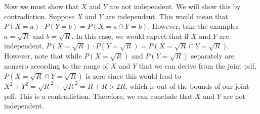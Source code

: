 \documentclass{article}
\begin{document}
{Now we must show that $X$ and $Y$ are not independent. We will show this by contradiction. Suppose $X$ and $Y$ are independent. This would mean that $P(X = a) \cdot P(Y = b) = P(X = a \cap Y = b)$. However, take the examples $a = \sqrt{R}$ and $b = \sqrt{R}$. In this case, we would expect that if  $X$ and $Y$ are independent, $P(X = \sqrt{R}) \cdot P(Y = \sqrt{R}) = P(X = \sqrt{R} \cap Y = \sqrt{R})$. However, note that while $P(X = \sqrt{R})$ and $P(Y = \sqrt{R})$ separately are nonzero according to the range of $X$ and $Y$ that we can derive from the joint pdf, $P(X = \sqrt{R} \cap Y = \sqrt{R})$ is zero since this would lead to $X^2 + Y^2 = \sqrt{R}^2 + \sqrt{R}^2 = R + R > 2R$, which is out of the bounds of our joint pdf. This is a contradiction. Therefore, we can conclude that $X$ and $Y$ are not independent.

}
\end{document}
